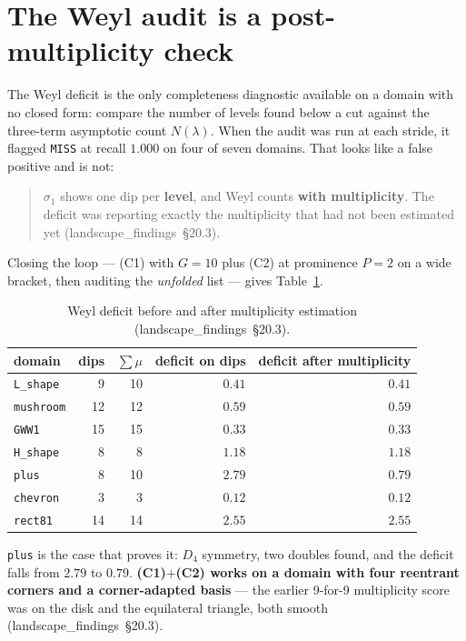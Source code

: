 \documentclass[11pt]{article}
\newcommand{\file}[1]{\texttt{#1}}
\newcommand{\lf}[1]{(landscape\_findings~\S#1)}
\newcommand{\sig}{\sigma}
\newcommand{\sione}{\sig_1}
\newcommand{\lam}{\lambda}
\begin{document}
\section{The Weyl audit is a post-multiplicity check}
\label{sec:weyl}

The Weyl deficit is the only completeness diagnostic available on a domain with no closed form:
compare the number of levels found below a cut against the three-term asymptotic count
$N(\lam)$. When the audit was run at each stride, it flagged \verb|MISS| at recall $1.000$ on
four of seven domains. That looks like a false positive and is not:

\begin{quote}
$\sione$ shows one dip per \textbf{level}, and Weyl counts \textbf{with multiplicity}. The
deficit was reporting exactly the multiplicity that had not been estimated yet \lf{20.3}.
\end{quote}

Closing the loop --- (C1) with $G=10$ plus (C2) at prominence $P=2$ on a wide bracket, then
auditing the \emph{unfolded} list --- gives Table~\ref{tab:weyl}.

\begin{table}[htbp]
\centering
\caption{Weyl deficit before and after multiplicity estimation \lf{20.3}.}
\label{tab:weyl}
\begin{tabular}{lrrrr}
\toprule
domain & dips & $\sum \mu$ & deficit on dips & deficit after multiplicity \\
\midrule
\file{L\_shape} &  9 & 10 & $0.41$ & $0.41$ \\
\file{mushroom} & 12 & 12 & $0.59$ & $0.59$ \\
\file{GWW1}     & 15 & 15 & $0.33$ & $0.33$ \\
\file{H\_shape} &  8 &  8 & $1.18$ & $1.18$ \\
\file{plus}     &  8 & 10 & $2.79$ & $\mathbf{0.79}$ \\
\file{chevron}  &  3 &  3 & $0.12$ & $0.12$ \\
\file{rect81}   & 14 & 14 & $2.55$ & $2.55$ \\
\bottomrule
\end{tabular}
\end{table}

\file{plus} is the case that proves it: $D_4$ symmetry, two doubles found, and the deficit falls
from $2.79$ to $0.79$. \textbf{(C1)$+$(C2) works on a domain with four reentrant corners and a
corner-adapted basis} --- the earlier 9-for-9 multiplicity score was on the disk and the
equilateral triangle, both smooth \lf{20.3}.
\end{document}
